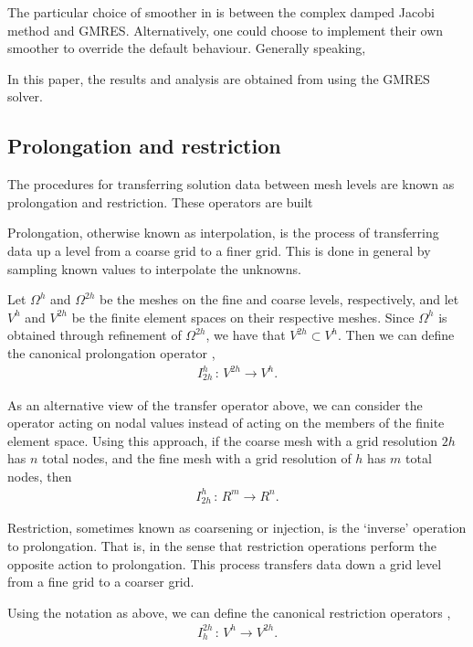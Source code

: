 \cite{elman}
The particular choice of smoother in \oomph is between the complex damped Jacobi method and GMRES.
Alternatively, one could choose to implement their own smoother to override the default behaviour.
Generally speaking, 

In this paper, the results and analysis are obtained from using the GMRES solver.




\subsection{Prolongation and restriction}

The procedures for transferring solution data between mesh levels are known as prolongation and restriction.
These operators are built 

Prolongation, otherwise known as interpolation, is the process of transferring data up a level from a coarse grid to a finer grid.
This is done in general by sampling known values to interpolate the unknowns.

Let $\Omega^h$ and $\Omega^{2h}$ be the meshes on the fine and coarse levels, respectively, and let $V^{h}$ and $V^{2h}$ be the finite element spaces on their respective meshes.
Since $\Omega^{h}$ is obtained through refinement of $\Omega^{2h}$, we have that $V^{2h}\subset V^h$.
Then we can define the canonical prolongation operator \cite{volker},
\begin{align}
	I^h_{2h} \, : \, V^{2h} \rightarrow V^h.
\end{align}

As an alternative view of the transfer operator above, we can consider the operator acting on nodal values instead of acting on the members of the finite element space.
Using this approach, if the coarse mesh with a grid resolution $2h$ has $n$ total nodes, and the fine mesh with a grid resolution of $h$ has $m$ total nodes, then
\begin{align}
	I^h_{2h} \, : \, R^m \rightarrow R^n.
\end{align}



Restriction, sometimes known as coarsening or injection, is the `inverse' operation to prolongation.
That is, in the sense that restriction operations perform the opposite action to prolongation.
This process transfers data down a grid level from a fine grid to a coarser grid.

Using the notation as above, we can define the canonical restriction operators \cite{volker},
\begin{align}
	I^{2h}_h \, : \, V^{h} \rightarrow V^{2h}.
\end{align}



